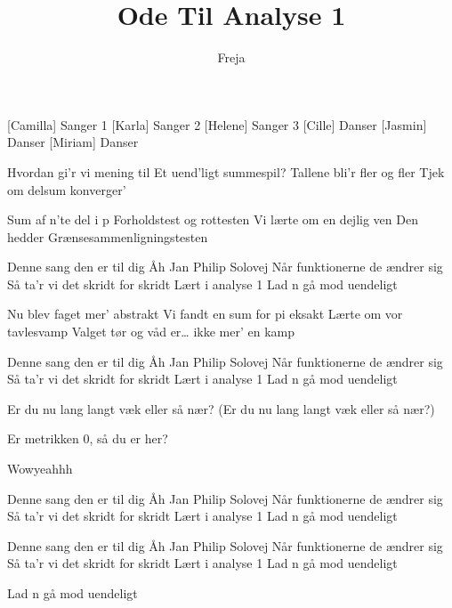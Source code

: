 \documentclass[a4paper,11pt]{article}
\title{Ode Til Analyse 1}
\author{Freja}
\begin{document}
\maketitle

\begin{roles}
[Camilla] Sanger 1
[Karla] Sanger 2
[Helene] Sanger 3
[Cille] Danser
[Jasmin] Danser
[Miriam] Danser
\end{roles}

\begin{song}
 Hvordan gi’r vi mening til
Et uend’ligt summespil?
Tallene bli’r fler og fler
Tjek om delsum konverger’

 Sum af n’te del i p
Forholdstest og rottesten
Vi lærte om en dejlig ven
 Den hedder Grænsesammenligningstesten

 Denne sang den er til dig
Åh Jan Philip Solovej
Når funktionerne de ændrer sig
Så ta’r vi det skridt for skridt
Lært i analyse 1
Lad n gå mod uendeligt

 Nu blev faget mer’ abstrakt
Vi fandt en sum for pi eksakt
Lærte om vor tavlesvamp
 Valget tør og våd er… ikke mer’ en kamp 

 Denne sang den er til dig
Åh Jan Philip Solovej
Når funktionerne de ændrer sig
Så ta’r vi det skridt for skridt
Lært i analyse 1
Lad n gå mod uendeligt

 Er du nu lang langt væk eller så nær?
 (Er du nu lang langt væk eller så nær?)

 Er metrikken 0, så du er her?

 Wowyeahhh

 Denne sang den er til dig
Åh Jan Philip Solovej
Når funktionerne de ændrer sig
Så ta’r vi det skridt for skridt
Lært i analyse 1
Lad n gå mod uendeligt

 Denne sang den er til dig
Åh Jan Philip Solovej
Når funktionerne de ændrer sig
Så ta’r vi det skridt for skridt
Lært i analyse 1
Lad n gå mod uendeligt

 Lad n gå mod uendeligt

\end{song}
\end{document}
